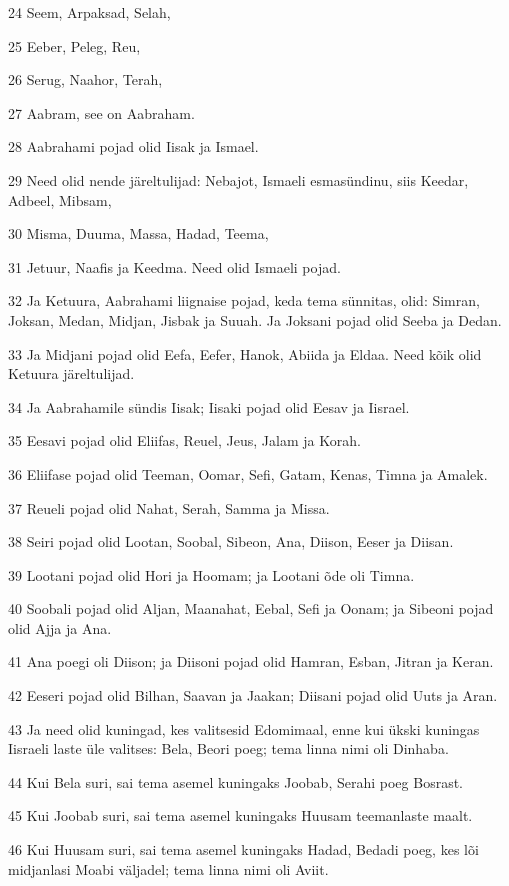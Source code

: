 \par 24 Seem, Arpaksad, Selah,
\par 25 Eeber, Peleg, Reu,
\par 26 Serug, Naahor, Terah,
\par 27 Aabram, see on Aabraham.
\par 28 Aabrahami pojad olid Iisak ja Ismael.
\par 29 Need olid nende järeltulijad: Nebajot, Ismaeli esmasündinu, siis Keedar, Adbeel, Mibsam,
\par 30 Misma, Duuma, Massa, Hadad, Teema,
\par 31 Jetuur, Naafis ja Keedma. Need olid Ismaeli pojad.
\par 32 Ja Ketuura, Aabrahami liignaise pojad, keda tema sünnitas, olid: Simran, Joksan, Medan, Midjan, Jisbak ja Suuah. Ja Joksani pojad olid Seeba ja Dedan.
\par 33 Ja Midjani pojad olid Eefa, Eefer, Hanok, Abiida ja Eldaa. Need kõik olid Ketuura järeltulijad.
\par 34 Ja Aabrahamile sündis Iisak; Iisaki pojad olid Eesav ja Iisrael.
\par 35 Eesavi pojad olid Eliifas, Reuel, Jeus, Jalam ja Korah.
\par 36 Eliifase pojad olid Teeman, Oomar, Sefi, Gatam, Kenas, Timna ja Amalek.
\par 37 Reueli pojad olid Nahat, Serah, Samma ja Missa.
\par 38 Seiri pojad olid Lootan, Soobal, Sibeon, Ana, Diison, Eeser ja Diisan.
\par 39 Lootani pojad olid Hori ja Hoomam; ja Lootani õde oli Timna.
\par 40 Soobali pojad olid Aljan, Maanahat, Eebal, Sefi ja Oonam; ja Sibeoni pojad olid Ajja ja Ana.
\par 41 Ana poegi oli Diison; ja Diisoni pojad olid Hamran, Esban, Jitran ja Keran.
\par 42 Eeseri pojad olid Bilhan, Saavan ja Jaakan; Diisani pojad olid Uuts ja Aran.
\par 43 Ja need olid kuningad, kes valitsesid Edomimaal, enne kui ükski kuningas Iisraeli laste üle valitses: Bela, Beori poeg; tema linna nimi oli Dinhaba.
\par 44 Kui Bela suri, sai tema asemel kuningaks Joobab, Serahi poeg Bosrast.
\par 45 Kui Joobab suri, sai tema asemel kuningaks Huusam teemanlaste maalt.
\par 46 Kui Huusam suri, sai tema asemel kuningaks Hadad, Bedadi poeg, kes lõi midjanlasi Moabi väljadel; tema linna nimi oli Aviit.
